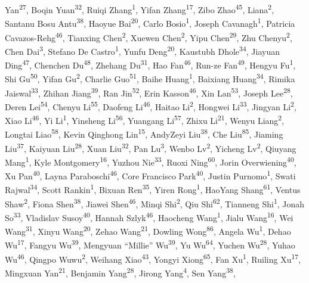 \documentclass{llmxive}
\begin{document}
Yan\textsuperscript{27}, Boqin Yuan\textsuperscript{32}, Ruiqi Zhang\textsuperscript{1}, Yifan Zhang\textsuperscript{17}, Zibo Zhao\textsuperscript{45}, Liana\textsuperscript{2}, Santanu Bosu Antu\textsuperscript{38}, Haoyue Bai\textsuperscript{20}, Carlo Bosio\textsuperscript{1}, Joseph Cavanagh\textsuperscript{1}, Patricia Cavazos-Rehg\textsuperscript{46}, Tianxing Chen\textsuperscript{2}, Xuewen Chen\textsuperscript{2}, Yipu Chen\textsuperscript{29}, Zhu Chenyu\textsuperscript{2}, Chen Dai\textsuperscript{3}, Stefano De Castro\textsuperscript{1}, Yunfu Deng\textsuperscript{20}, Kaustubh Dhole\textsuperscript{34}, Jiayuan Ding\textsuperscript{47}, Chenchen Du\textsuperscript{48}, Zhehang Du\textsuperscript{31}, Hao Fan\textsuperscript{46}, Run-ze Fan\textsuperscript{49}, Hengyu Fu\textsuperscript{1}, Shi Gu\textsuperscript{50}, Yifan Gu\textsuperscript{2}, Charlie Guo\textsuperscript{51}, Baihe Huang\textsuperscript{1}, Baixiang Huang\textsuperscript{34}, Rimika Jaiswal\textsuperscript{33}, Zhihan Jiang\textsuperscript{39}, Ran Jin\textsuperscript{52}, Erin Kasson\textsuperscript{46}, Xin Lan\textsuperscript{53}, Joseph Lee\textsuperscript{28}, Deren Lei\textsuperscript{54}, Chenyu Li\textsuperscript{55}, Daofeng Li\textsuperscript{46}, Haitao Li\textsuperscript{2}, Hongwei Li\textsuperscript{33}, Jingyan Li\textsuperscript{2}, Xiao Li\textsuperscript{46}, Yi Li\textsuperscript{1}, Yinsheng Li\textsuperscript{56}, Yuangang Li\textsuperscript{57}, Zhixu Li\textsuperscript{21}, Wenyu Liang\textsuperscript{2}, Longtai Liao\textsuperscript{58}, Kevin Qinghong Lin\textsuperscript{15}, AndyZeyi Liu\textsuperscript{38}, Che Liu\textsuperscript{85}, Jiaming Liu\textsuperscript{37}, Kaiyuan Liu\textsuperscript{28}, Xuan Liu\textsuperscript{32}, Pan Lu\textsuperscript{3}, Wenbo Lv\textsuperscript{2}, Yicheng Lv\textsuperscript{2}, Qiuyang Mang\textsuperscript{1}, Kyle Montgomery\textsuperscript{16}, Yuzhou Nie\textsuperscript{33}, Ruoxi Ning\textsuperscript{60}, Jorin Overwiening\textsuperscript{40}, Xu Pan\textsuperscript{40}, Layna Paraboschi\textsuperscript{46}, Core Francisco Park\textsuperscript{40}, Justin Purnomo\textsuperscript{1}, Swati Rajwal\textsuperscript{34}, Scott Rankin\textsuperscript{1}, Bixuan Ren\textsuperscript{35}, Yiren Rong\textsuperscript{1}, HaoYang Shang\textsuperscript{61}, Ventus Shaw\textsuperscript{2}, Fiona Shen\textsuperscript{38}, Jiawei Shen\textsuperscript{46}, Minqi Shi\textsuperscript{2}, Qiu Shi\textsuperscript{62}, Tianneng Shi\textsuperscript{1}, Jonah So\textsuperscript{33}, Vladislav Susoy\textsuperscript{40}, Hannah Szlyk\textsuperscript{46}, Haocheng Wang\textsuperscript{1}, Jialu Wang\textsuperscript{16}, Wei Wang\textsuperscript{31}, Xinyu Wang\textsuperscript{20}, Zehao Wang\textsuperscript{21}, Dowling Wong\textsuperscript{86}, Angela Wu\textsuperscript{1}, Dehao Wu\textsuperscript{17}, Fangyu Wu\textsuperscript{39}, Mengyuan ``Millie'' Wu\textsuperscript{39}, Yu Wu\textsuperscript{64}, Yuchen Wu\textsuperscript{28}, Yuhao Wu\textsuperscript{46}, Qingpo Wuwu\textsuperscript{2}, Weihang Xiao\textsuperscript{43}, Yongyi Xiong\textsuperscript{65}, Fan Xu\textsuperscript{1}, Ruiling Xu\textsuperscript{17}, Mingxuan Yan\textsuperscript{21}, Benjamin Yang\textsuperscript{28}, Jirong Yang\textsuperscript{4}, Sen Yang\textsuperscript{38}, 
\end{document}
